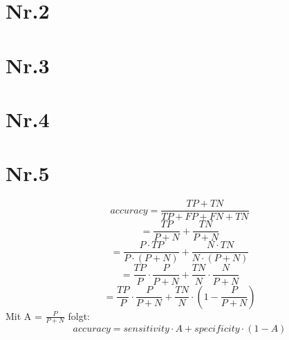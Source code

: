 \documentclass[a4paper,11pt,twoside]{article}
\begin{document}
\section*{Nr.2}


\section*{Nr.3}



\section*{Nr.4}


\section*{Nr.5}
\[accuracy = \frac{TP + TN}{TP + FP + FN + TN}\]
\[= \frac{TP}{P+N} + \frac{TN}{P+N}\]
\[= \frac{P \cdot TP}{P \cdot (P+N)} + \frac{N \cdot TN}{N \cdot (P +N)}\]
\[= \frac{TP}{P} \cdot \frac{P}{P+N} + \frac{TN}{N} \cdot \frac{N}{P+N} \]
\[= \frac{TP}{P} \cdot \frac{P}{P+N} + \frac{TN}{N} \cdot \left(1- \frac{P}{P+N}\right) \]
Mit A = $\frac{P}{P+N}$ folgt: 
\[accuracy = sensitivity \cdot A + specificity \cdot (1-A)\]
\end{document}
